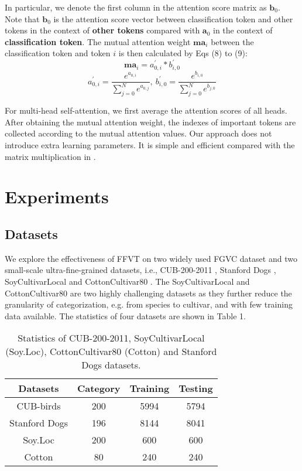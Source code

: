 \documentclass{bmvc2k}
\begin{document}
\par
In particular, we denote the first column in the attention score matrix as $\bm{b}_0$. Note that $\bm{b}_0$ is the attention score vector between classification token and other tokens in the context of \textbf{other tokens} compared with $\bm{a}_0$ in the context of \textbf{classification token}. The mutual attention weight $\bm{ma}_i$ between the classification token and token $i$ is then calculated by Eqs (8) to (9):
\begin{equation}
 \bm{ma}_i=a^{'}_{0,i}*b^{'}_{i,0}
\end{equation}
\begin{equation}
 a^{'}_{0,i}=\frac{e^{a_{0,i}}}{\sum_{j=0}^{N}e^{a_{0,j}}}, \   
 b^{'}_{i,0}=\frac{e^{b_{i,0}}}{\sum_{j=0}^{N}e^{b_{j,0}}}
\end{equation}
\par
For multi-head self-attention, we first average the attention scores of all heads. After obtaining the mutual attention weight, the indexes of important tokens are collected according to the mutual attention values. Our approach does not introduce extra learning parameters. It is simple and efficient compared with the matrix multiplication in \cite{he2021transfg}.


\section{Experiments}

\subsection{Datasets}
We explore the effectiveness of FFVT on two widely used FGVC dataset and two small-scale ultra-fine-grained datasets, i.e., CUB-200-2011 \cite{wah2011caltech}, Stanford Dogs \cite{khosla2011novel}, SoyCultivarLocal \cite{yu2020patchy} and CottonCultivar80 \cite{yu2020patchy}. The SoyCultivarLocal  and CottonCultivar80  are two highly challenging datasets as they further reduce the granularity of categorization, e.g. from species to cultivar, and with few training data available. The statistics of four datasets are shown in Table 1.

\begin{table}
\begin{center}
\begin{tabular}{|c|c|c|c|}
\hline
Datasets & Category & Training & Testing \\
\hline
CUB-birds & 200 & 5994 & 5794 \\
\hline
Stanford Dogs & 196 & 8144 & 8041 \\
\hline
Soy.Loc & 200 & 600 & 600 \\
\hline
Cotton & 80 & 240 & 240 \\
\hline
\end{tabular}
\end{center}
\caption{Statistics of CUB-200-2011, SoyCultivarLocal (Soy.Loc), CottonCultivar80 (Cotton) and Stanford Dogs datasets.}
\end{table}
\end{document}
